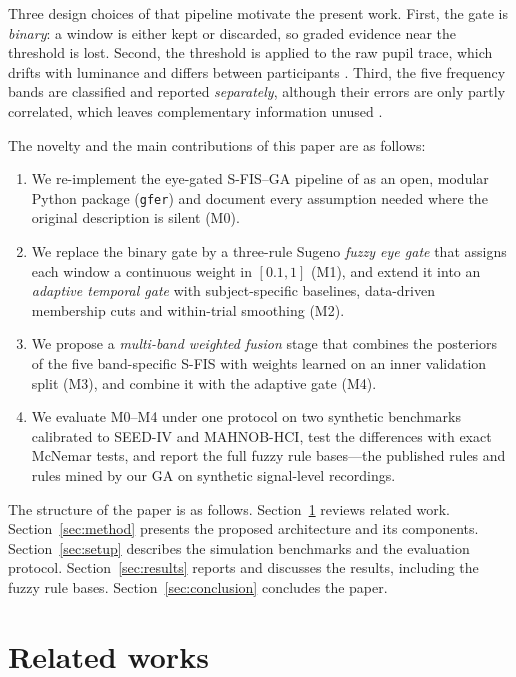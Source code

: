 \documentclass[10pt,twoside]{article}
\begin{document}
Three design choices of that pipeline motivate the present work. First, the gate is \emph{binary}: a window is either kept or discarded, so graded evidence near the threshold is lost. Second, the threshold is applied to the raw pupil trace, which drifts with luminance and differs between participants \cite{Kret2019,Mathot2018}. Third, the five frequency bands are classified and reported \emph{separately}, although their errors are only partly correlated, which leaves complementary information unused \cite{Kittler1998}.

The novelty and the main contributions of this paper are as follows:
\begin{enumerate}
\item We re-implement the eye-gated S-FIS--GA pipeline of \cite{FarhadiSedehi2024a} as an open, modular Python package (\texttt{gfer}) and document every assumption needed where the original description is silent (M0).
\item We replace the binary gate by a three-rule Sugeno \emph{fuzzy eye gate} that assigns each window a continuous weight in $[0.1,1]$ (M1), and extend it into an \emph{adaptive temporal gate} with subject-specific baselines, data-driven membership cuts and within-trial smoothing (M2).
\item We propose a \emph{multi-band weighted fusion} stage that combines the posteriors of the five band-specific S-FIS with weights learned on an inner validation split (M3), and combine it with the adaptive gate (M4).
\item We evaluate M0--M4 under one protocol on two synthetic benchmarks calibrated to SEED-IV and MAHNOB-HCI, test the differences with exact McNemar tests, and report the full fuzzy rule bases---the published rules and rules mined by our GA on synthetic signal-level recordings.
\end{enumerate}

The structure of the paper is as follows. Section~\ref{sec:related} reviews related work. Section~\ref{sec:method} presents the proposed architecture and its components. Section~\ref{sec:setup} describes the simulation benchmarks and the evaluation protocol. Section~\ref{sec:results} reports and discusses the results, including the fuzzy rule bases. Section~\ref{sec:conclusion} concludes the paper.

\section{Related works}\label{sec:related}
\end{document}
